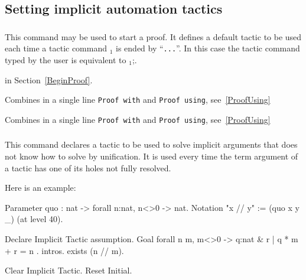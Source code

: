 \subsection{Setting implicit automation tactics}

\subsubsection{}
\label{ProofWith}

  This command may be used to start a proof. It defines a default
  tactic to be used each time a tactic command {\tac$_1$} is ended by
  ``\verb#...#''. In this case the tactic command typed by the user is
  equivalent to \tac$_1$;{\tac}.

 in Section~\ref{BeginProof}.

\begin{Variants}

\item {}

  Combines in a single line {\tt Proof with} and {\tt Proof using},
  see~\ref{ProofUsing}

\item {}

  Combines in a single line {\tt Proof with} and {\tt Proof using},
  see~\ref{ProofUsing}

\end{Variants}

\subsubsection{}\label{DeclareImplicit}

This command declares a tactic to be used to solve implicit arguments
that {\Coq} does not know how to solve by unification. It is used
every time the term argument of a tactic has one of its holes not
fully resolved.

Here is an example:

\begin{coq_example}
Parameter quo : nat -> forall n:nat, n<>0 -> nat.
Notation "x // y" := (quo x y _) (at level 40).

Declare Implicit Tactic assumption.
Goal forall n m, m<>0 -> { q:nat & { r | q * m + r = n } }.
intros.
exists (n // m).
\end{coq_example}
\begin{coq_eval}
Clear Implicit Tactic.
Reset Initial.
\end{coq_eval}

